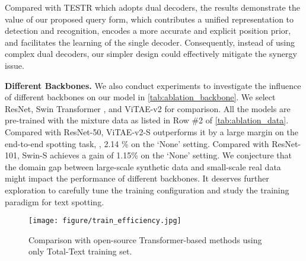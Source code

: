 \documentclass[10pt,twocolumn,letterpaper]{article}
\begin{document}
Compared with TESTR which adopts dual decoders, the results demonstrate the value of our proposed query form, which contributes a unified representation to detection and recognition, encodes a more accurate and explicit position prior, and facilitates the learning of the single decoder. Consequently, instead of using complex dual decoders, our simpler design could effectively mitigate the synergy issue.

\noindent \textbf{Different Backbones.} We also conduct experiments to investigate the influence of different backbones on our model in \cref{tab:ablation_backbone}. We select ResNet, Swin Transformer \cite{liu2021swin}, and ViTAE-v2 \cite{zhang2022vitaev2} for comparison. All the models are pre-trained with the mixture data as listed in Row \#2 of \cref{tab:ablation_data}. Compared with ResNet-50, ViTAE-v2-S outperforms it by a large margin on the end-to-end spotting task, \ie, 2.14 \% on the `None' setting. Compared with ResNet-101, Swin-S achieves a gain of 1.15\% on the ‘None’ setting. We conjecture that the domain gap between large-scale synthetic data and small-scale real data might impact the performance of different backbones. It deserves further exploration to carefully tune the training configuration and study the training paradigm for text spotting.

\begin{figure}[!t]
    \centering
    \texttt{[image: figure/train\_efficiency.jpg]}
    \caption{Comparison with open-source Transformer-based methods using only Total-Text training set.}
    \label{fig:train_eff}
\end{figure}
\end{document}
